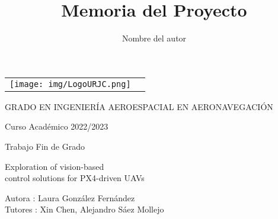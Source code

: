 \documentclass[a4paper, 12pt]{book}
\title{Memoria del Proyecto}
\author{Nombre del autor}
\begin{document}
 


\begin{titlepage}
\begin{center}
\begin{tabular}[c]{c c}
\texttt{[image: img/LogoURJC.png]}
\\
\end{tabular}

\vspace{3cm}

\Large 
GRADO EN INGENIERÍA AEROESPACIAL EN AERONAVEGACIÓN

\vspace{0.4cm}

\large
Curso Académico 2022/2023

\vspace{0.8cm}

Trabajo Fin de Grado

\vspace{2cm}

\LARGE Exploration of vision-based \\
control solutions for PX4-driven UAVs
\vspace{3cm}

\large
Autora : Laura González Fernández \\
Tutores : Xin Chen, Alejandro Sáez Mollejo
\end{center}
\end{titlepage}

\newpage
\mbox{}
\thispagestyle{empty} %


\clearpage
{}
\chapter*{}
\end{document}
